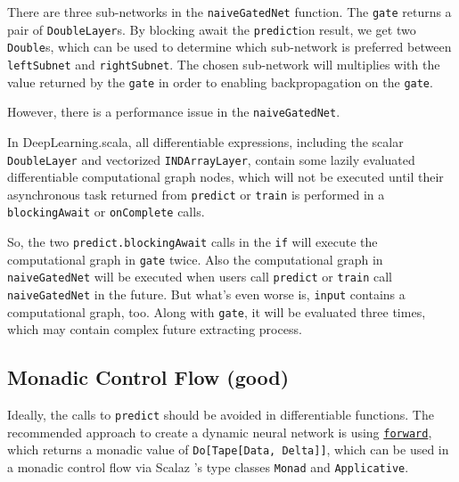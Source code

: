 There are three sub-networks in the \lstinline{naiveGatedNet} function. The \lstinline{gate} returns a pair of \lstinline{DoubleLayer}s. By blocking await the \lstinline{predict}ion result, we get two \lstinline{Double}s, which can be used to determine which sub-network is preferred between \lstinline{leftSubnet} and \lstinline{rightSubnet}. The chosen sub-network will multiplies with the value returned by the \lstinline{gate} in order to enabling backpropagation on the \lstinline{gate}.

However, there is a performance issue in the \lstinline{naiveGatedNet}.

In DeepLearning.scala, all differentiable expressions, including the scalar \lstinline{DoubleLayer} and vectorized \lstinline{INDArrayLayer}, contain some lazily evaluated differentiable \gls{computational graph} nodes, which will not be executed until their asynchronous task returned from \lstinline{predict} or \lstinline{train} is performed in a \lstinline{blockingAwait} or \lstinline{onComplete} calls.

So, the two \lstinline{predict.blockingAwait} calls in the \lstinline{if} will execute the \gls{computational graph} in \lstinline{gate} twice. Also the \gls{computational graph} in \lstinline{naiveGatedNet} will be executed when users call \lstinline{predict} or \lstinline{train} call \lstinline{naiveGatedNet} in the future. But what's even worse is, \lstinline{input} contains a \gls{computational graph}, too. Along with \lstinline{gate}, it will be evaluated three times, which may contain complex future extracting process.

\subsection{Monadic Control Flow (good)}
\label{monadic}

Ideally, the calls to \lstinline{predict} should be avoided in differentiable functions. The recommended approach to create a dynamic neural network is using \href{https://javadoc.io/page/com.thoughtworks.deeplearning/deeplearning_2.11/latest/com/thoughtworks/deeplearning/DeepLearning.html#forward(differentiable:Differentiable):com.thoughtworks.raii.asynchronous.Do[com.thoughtworks.deeplearning.DeepLearning.Tape[DeepLearning.this.Data,DeepLearning.this.Delta]]}{\lstinline{forward}}, which returns a monadic value of \lstinline{Do[Tape[Data, Delta]]}, which can be used in a monadic control flow via Scalaz \cite{kenji2017scalaz}'s type classes \cite{oliveira2010type} \lstinline{Monad} and \lstinline{Applicative}.

